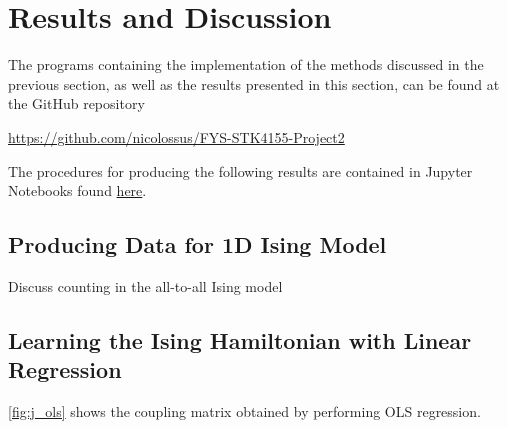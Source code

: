 \section{Results and Discussion}\label{sec:Results}

The programs containing the implementation of the methods discussed in the previous section, as well as the results presented in this section, can be found at the GitHub repository
\begin{center}
    \url{https://github.com/nicolossus/FYS-STK4155-Project2}
\end{center}

The procedures for producing the following results are contained in Jupyter Notebooks found \href{https://github.com/nicolossus/FYS-STK4155-Project2/tree/master/notebooks}{here}.


\subsection{Producing Data for 1D Ising Model}\label{sec:results datagen}

Discuss counting in the all-to-all Ising model

\subsection{Learning the Ising Hamiltonian with Linear Regression}\label{sec:results linreg}

\autoref{fig:j_ols} shows the coupling matrix obtained by performing OLS regression.

